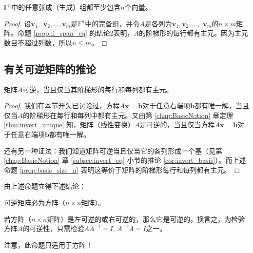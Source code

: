 \begin{proposition}\label{prop:span_more}
  $\mathbb{F}^{n}$中的任意张成（生成）组都至少包含$n$个向量。
\end{proposition}
\begin{proof}
  设$\mathbf{v}_{1},$ $\mathbf{v}_{2},\ldots,\mathbf{v}_{m}$是$\mathbb{F}^{n}$中的完备组，并令$A$是各列为$\mathbf{v}_{1},\mathbf{v}_{2},\ldots,$ $\mathbf{v}_{m}$的$n\times m$矩阵。命题 \ref{prop:li_span_eq} 的结论2表明，$A$的阶梯形的每行都有主元。因为主元数目不超过列数，所以$n\le m$。
\end{proof}

\subsection{有关可逆矩阵的推论}

\begin{proposition}
  矩阵$A$可逆，当且仅当其阶梯形的每行和每列都有主元。
\end{proposition}

\begin{proof}
  我们在本节开头已讨论过，方程$A\mathbf{x}=\mathbf{b}$对于任意右端项$\mathbf{b}$都有唯一解，当且仅当$A$的阶梯形在每行和每列中都有主元。又由第 \ref{chap:BasicNotion} 章定理 \ref{thm:invert_unique} 知，矩阵（线性变换）$A$是可逆的，当且仅当方程$A\mathbf{x}=\mathbf{b}$对于任意右端项$\mathbf{b}$都有唯一解。

  还有另一种证法：我们知道矩阵可逆当且仅当它的各列形成一个基（见第 \ref{chap:BasicNotion} 章 \ref{subsec:invert_eq} 小节的推论 \ref{cor:invert_basis}）。而上述命题 \ref{prop:basis_size_n} 表明这等价于矩阵的阶梯形每行和每列都有主元。
\end{proof}

由上述命题立得下述结论：
\begin{corollary}
  可逆矩阵必为方阵（$n\times n$矩阵）。
\end{corollary}
\begin{proposition}
  若方阵（$n\times n$矩阵）是左可逆的或右可逆的，那么它是可逆的。换言之，为检验方阵$A$的可逆性，只需检验$AA^{-1}=I$, $A^{-1}A=I$之一。
\end{proposition}

注意，此命题只适用于方阵！

